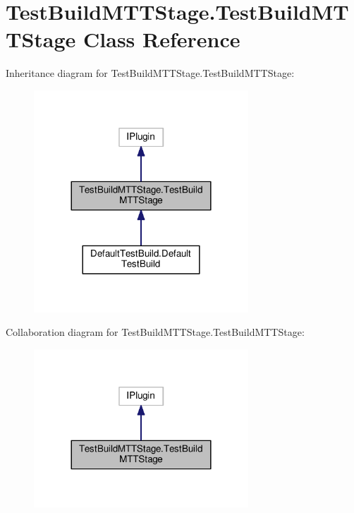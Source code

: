 \hypertarget{class_test_build_m_t_t_stage_1_1_test_build_m_t_t_stage}{\section{Test\-Build\-M\-T\-T\-Stage.\-Test\-Build\-M\-T\-T\-Stage Class Reference}
\label{class_test_build_m_t_t_stage_1_1_test_build_m_t_t_stage}
}


Inheritance diagram for Test\-Build\-M\-T\-T\-Stage.\-Test\-Build\-M\-T\-T\-Stage\-:
\nopagebreak
\begin{figure}[H]
\begin{center}
\leavevmode
\includegraphics[width=228pt]{class_test_build_m_t_t_stage_1_1_test_build_m_t_t_stage__inherit__graph}
\end{center}
\end{figure}


Collaboration diagram for Test\-Build\-M\-T\-T\-Stage.\-Test\-Build\-M\-T\-T\-Stage\-:
\nopagebreak
\begin{figure}[H]
\begin{center}
\leavevmode
\includegraphics[width=228pt]{class_test_build_m_t_t_stage_1_1_test_build_m_t_t_stage__coll__graph}
\end{center}
\end{figure}

